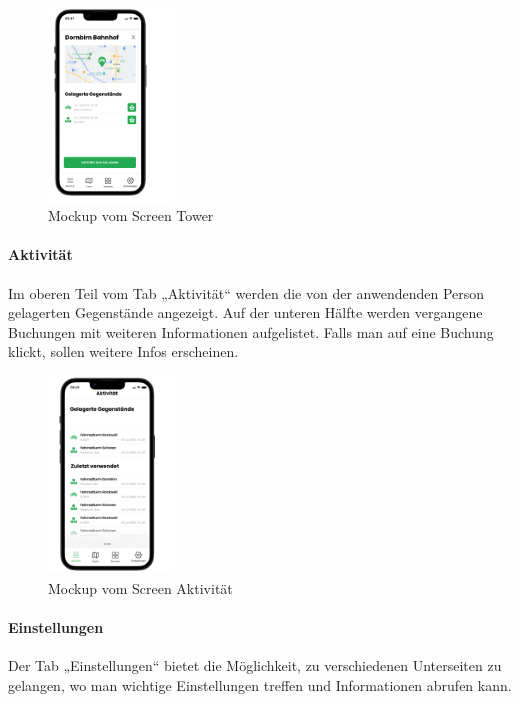 \begin{figure}[H]
  \centering
  \includegraphics[width=0.3\textwidth]{images/app_mock_tower}
  \caption{\Gls{Mockup} vom Screen Tower}
  \label{fig:screentowermock}
\end{figure}

\bigskip


\paragraph{Aktivität}Im oberen Teil vom \Gls{Tab} „Aktivität“ werden die von der anwendenden Person gelagerten Gegenstände angezeigt. Auf der unteren Hälfte werden vergangene Buchungen mit weiteren Informationen aufgelistet. Falls man auf eine Buchung klickt, sollen weitere Infos erscheinen.

\begin{figure}[H]
  \centering
  \includegraphics[width=0.3\textwidth]{images/app_mock_objects}
  \caption{\Gls{Mockup} vom Screen Aktivität}
  \label{fig:screenactivitymock}
\end{figure}

\bigskip


\paragraph{Einstellungen}Der \Gls{Tab} „Einstellungen“ bietet die Möglichkeit, zu verschiedenen Unterseiten zu gelangen, wo man wichtige Einstellungen treffen und Informationen abrufen kann.

